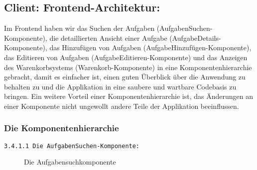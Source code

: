 \subsection{Client: Frontend-Architektur:} 

Im Frontend haben wir das Suchen der Aufgaben (AufgabenSuchen-Komponente), die detaillierten Ansicht einer Aufgabe (AufgabeDetails-Komponente), das Hinzufügen von Aufgaben (AufgabeHinzufügen-Komponente), das Editieren von Aufgaben (AufgabeEditieren-Komponente) und das Anzeigen des Warenkorbsystems (Warenkorb-Komponente) in eine Komponentenhierarchie gebracht, damit es einfacher ist, einen guten Überblick über die Anwendung zu behalten zu und die Applikation in eine saubere und wartbare Codebasis zu bringen.
Ein weitere Vorteil einer Komponentenhierarchie ist, das Änderungen an einer Komponente nicht ungewollt andere Teile der Applikation beeinflussen.

\subsubsection{Die Komponentenhierarchie}

\texttt{3.4.1.1 Die AufgabenSuchen-Komponente:}
\begin{figure}[ht]
  \caption{Die Aufgabensuchkomponente \cite{fig:aufgabensuche}}
\end{figure}


